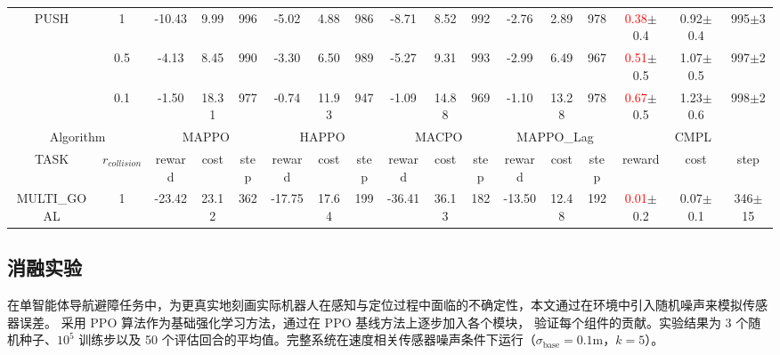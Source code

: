 \begin{table}[h!]
\begin{center}
{\begin{tabular}{cc|*{4}{ccc|}ccc}
      \multirow{3}{*}{PUSH}
      & 1
          & -10.43 & 9.99 & 996
          & -5.02 & 4.88 & 986
          & -8.71 & 8.52 & 992
          & -2.76 & 2.89 & 978
          &  \textcolor{red}{0.38}{\tiny$\pm$0.4} & \textcolor{Green3}{0.92}{\tiny$\pm$0.4} & 995{\tiny$\pm$3} \\
      & 0.5
          & -4.13 & 8.45 & 990
          & -3.30 & 6.50 & 989
          & -5.27 & 9.31 & 993
          & -2.99 & 6.49 & 967
          & \textcolor{red}{0.51}{\tiny$\pm$0.5} & \textcolor{Green3}{1.07}{\tiny$\pm$0.5} & 997{\tiny$\pm$2} \\
      & 0.1
          & -1.50 & 18.31 & 977
          & -0.74 & 11.93 & 947
          & -1.09 & 14.88 & 969
          & -1.10 & 13.28 & 978
          & \textcolor{red}{0.67}{\tiny$\pm$0.5} & \textcolor{Green3}{1.23}{\tiny$\pm$0.6} & 998{\tiny$\pm$2} \\ \hline

      \multicolumn{2}{c|}{Algorithm} &
      \multicolumn{3}{c|}{MAPPO} &
      \multicolumn{3}{c|}{HAPPO} &
      \multicolumn{3}{c|}{MACPO} &
      \multicolumn{3}{c|}{MAPPO\_Lag} &
      \multicolumn{3}{c}{CMPL}\\
      TASK & $r_{collision}$
          & reward & cost & step
          & reward & cost & step
          & reward & cost & step
          & reward & cost & step
          & reward & cost & step \\ \hline

      MULTI\_GOAL
      & 1
          & -23.42 & 23.12 & 362
          & -17.75 & 17.64 & 199
          & -36.41 & 36.13 & 182
          & -13.50 & 12.48 & 192
          & \textcolor{red}{0.01}{\tiny$\pm$0.2} & \textcolor{Green3}{0.07}{\tiny$\pm$0.1} & 346{\tiny$\pm$15}
  \\ \hline

      \end{tabular}
      }
    \end{center}
  \end{table}
\subsection{消融实验}
在单智能体导航避障任务中，为更真实地刻画实际机器人在感知与定位过程中面临的不确定性，本文通过在环境中引入随机噪声来模拟传感器误差。
采用 PPO 算法作为基础强化学习方法，通过在 PPO 基线方法上逐步加入各个模块，
验证每个组件的贡献。实验结果为 3 个随机种子、$10^5$ 训练步以及 50 个评估回合的平均值。完整系统在速度相关传感器噪声条件下运行（$\sigma_{\text{base}} = 0.1$m，$k=5$）。

